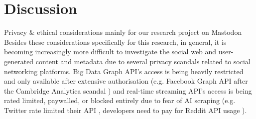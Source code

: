 \section{Discussion}

Privacy \& ethical considerations mainly for our research project on Mastodon \\ 


Besides these considerations specifically for this research, in general, it is becoming increasingly more difficult to investigate the social web and user-generated content and metadata due to several privacy scandals related to social networking platforms. Big Data Graph API's access is being heavily restricted and only available after extensive authorisation (e.g. Facebook Graph API after the Cambridge Analytica scandal \cite{cambridge}) and real-time streaming API's access is being rated limited, paywalled, or blocked entirely due to fear of AI scraping (e.g. Twitter rate limited their API \cite{Twitter}, developers need to pay for Reddit API usage \cite{reddit}).